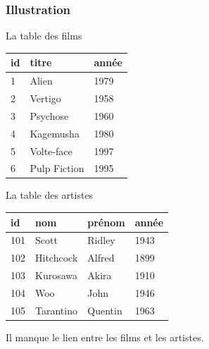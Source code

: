 \begin{frame}[fragile]
\frametitle{Illustration}

\alert{La table des films}

\medskip

\begin{small}
   \begin{tabular}[!ht]{l|l|l}
    \textbf{id} & \textbf{titre} & \textbf{année} \\
     \hline
    1 & Alien & 1979 \\
    2 & Vertigo & 1958 \\
    3 & Psychose & 1960 \\
    4 & Kagemusha & 1980 \\
    5 & Volte-face & 1997 \\
    6 & Pulp Fiction & 1995 \\
     \hline
   \end{tabular}
   \end{small}
 \medskip
 
\alert{La table des artistes}
\medskip

\begin{small}
   \begin{tabular}[!ht]{l|l|l|l}
    \textbf{id} & \textbf{nom} & \textbf{prénom} &  \textbf{année} \\
     \hline
    101 & Scott & Ridley & 1943 \\
    102 & Hitchcock & Alfred & 1899 \\
    103 & Kurosawa & Akira & 1910 \\
    104 & Woo & John & 1946 \\
    105 & Tarantino & Quentin & 1963 \\
     \hline
   \end{tabular}
 \end{small}
\medskip

\alert{Il manque le lien entre les films et les artistes.}

\end{frame}
 
